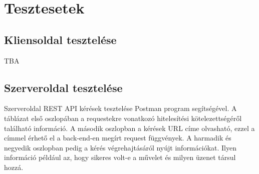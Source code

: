
\section{Tesztesetek}

\subsection{Kliensoldal tesztelése}
TBA


\subsection{Szerveroldal tesztelése}
Szerveroldal REST API kérések tesztelése Postman program segítségével. A táblázat első oszlopában a requestekre vonatkozó hitelesítési kötelezettségéről található információ. A második oszlopban a kérések URL címe olvasható, ezzel a címmel érhető el a back-end-en megírt request függvények.  A harmadik és negyedik oszlopban pedig a kérés végrehajtásáról nyújt információkat. Ilyen információ például az, hogy sikeres volt-e a művelet és milyen üzenet társul hozzá.

